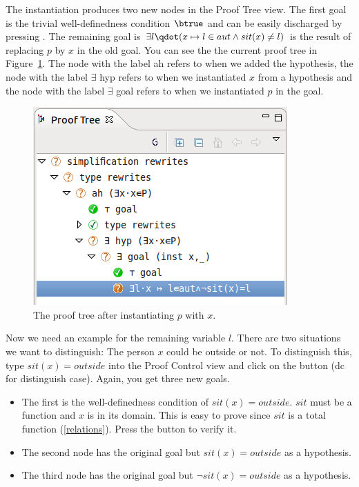 The instantiation produces two new nodes in the \textsf{Proof Tree} view. The first goal is the trivial well-definedness condition $\btrue$ and
  can be easily discharged by pressing .
The remaining goal is $\exists l\qdot (x \mapsto  l \in  aut \land  sit(x) \neq l)$ is the result of replacing $p$ by $x$ in the old goal.
You can see the the current proof tree in Figure~\ref{fig_tut_10_proof_tree}. The node with the label \textsf{ah} refers to when we added the hypothesis, the node with the label \textsf{$\exists$ hyp} refers to when we instantiated $x$ from a hypothesis and the node with the label \textsf{$\exists$ goal} refers to when we instantiated $p$ in the goal.

\begin{figure}[!ht]
\begin{center}
	\includegraphics{img/tutorial/tut_10_proof_tree.png}
	\caption{The proof tree after instantiating $p$ with $x$.}
	\label{fig_tut_10_proof_tree}
\end{center}
\end{figure}

Now we need an example for the remaining variable $l$.
There are two situations we want to distinguish: The person $x$ could be outside or not.
To distinguish this, type $sit(x) = outside$ into the \textsf{Proof Control} view and click on the button  (\textsf{dc} for distinguish case).
Again, you get three new goals.

\begin{itemize}
\item The first is the well-definedness condition of $sit(x) = outside$. $sit$ must be a function and $x$ is in its domain.
  This is easy to prove since $sit$ is a total function (\ref{relations}). Press the  button to verify it.
\item The second node has the original goal but $sit(x) = outside$ as a hypothesis.
\item The third node has the original goal but $\lnot sit(x) = outside$ as a hypothesis.
\end{itemize}

